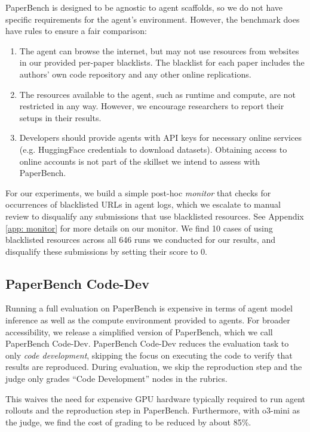 \documentclass{article}
\theoremstyle{plain}
\theoremstyle{definition}
\theoremstyle{remark}
\begin{document}
PaperBench is designed to be agnostic to agent scaffolds, so we do not have specific requirements for the agent's environment. However, the benchmark does have rules to ensure a fair comparison:
\begin{enumerate}
[itemsep=1pt, topsep=0pt]
\item The agent can browse the internet, but may not use resources from websites in our provided per-paper blacklists. The blacklist for each paper includes the authors’ own code repository and any other online replications.
\item The resources available to the agent, such as runtime and compute, are not restricted in any way. However, we encourage researchers to report their setups in their results.
\item Developers should provide agents with API keys for necessary online services (e.g. HuggingFace credentials to download datasets). Obtaining access to online accounts is not part of the skillset we intend to assess with PaperBench.
\end{enumerate}

For our experiments, we build a simple post-hoc \textit{monitor} that checks for occurrences of blacklisted URLs in agent logs, which we escalate to manual review to disqualify any submissions that use blacklisted resources. See Appendix \ref{app: monitor} for more details on our monitor. We find 10 cases of using blacklisted resources across all 646 runs we conducted for our results, and disqualify these submissions by setting their score to 0. 

\subsection{PaperBench Code-Dev}
\label{sec:paperbench-code-dev}
Running a full evaluation on PaperBench is expensive in terms of agent model inference as well as the compute environment provided to agents. For broader accessibility, we release a simplified version of PaperBench, which we call PaperBench Code-Dev. PaperBench Code-Dev reduces the evaluation task to only \textit{code development}, skipping the focus on executing the code to verify that results are reproduced. During evaluation, we skip the reproduction step and the judge only grades “Code Development” nodes in the rubrics. 

This waives the need for expensive GPU hardware typically required to run agent rollouts and the reproduction step in PaperBench. Furthermore, with o3-mini as the judge, we find the cost of grading to be reduced by about 85\%.
\end{document}
